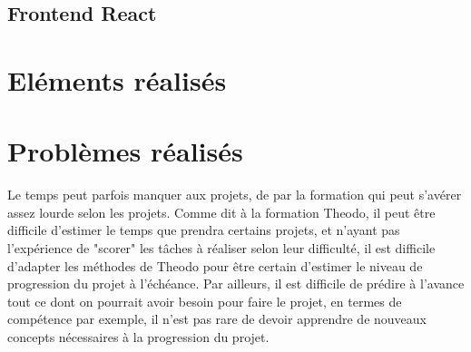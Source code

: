 \documentclass[12pt,twoside,a4paper]{article}
\begin{document}
\subsection{Frontend React}

\section{El\'ements r\'ealis\'es}



\section{Probl\`emes r\'ealis\'es}

Le temps peut parfois manquer aux projets, de par la formation qui peut s'avérer assez lourde selon les projets. 
Comme dit à la formation Theodo, il peut être difficile d'estimer le temps que prendra certains projets, et n'ayant pas l'expérience de "scorer" les tâches à réaliser selon leur difficulté, il est difficile d'adapter les méthodes de Theodo pour être certain d'estimer le niveau de progression du projet à l'échéance. Par ailleurs, il est difficile de prédire à l'avance tout ce dont on pourrait avoir besoin pour faire le projet, en termes de compétence par exemple, il n'est pas rare de devoir apprendre de nouveaux concepts nécessaires à la progression du projet. 
\end{document}
